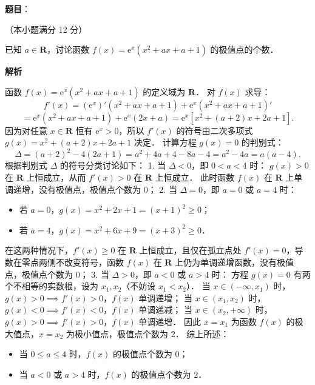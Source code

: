 \begin{answer}

\textbf{题目}：

（本小题满分 12 分）

已知 $a \in \mathbf{R}$，讨论函数 $f(x) = \mathrm{e}^x(x^2 + ax + a + 1)$ 的极值点的个数．

\textbf{解析}

函数 $f(x) = \mathrm{e}^x(x^2 + ax + a + 1)$ 的定义域为 $\mathbf{R}$．
对 $f(x)$ 求导：
\nopagebreak[4]
\[
f'(x) = (\mathrm{e}^x)'(x^2 + ax + a + 1) + \mathrm{e}^x(x^2 + ax + a + 1)'
\]
\nopagebreak[4]
\[
= \mathrm{e}^x (x^2 + ax + a + 1) + \mathrm{e}^x (2x + a) = \mathrm{e}^x [x^2 + (a + 2)x + 2a + 1].
\]
因为对任意 $x \in \mathbf{R}$ 恒有 $\mathrm{e}^x > 0$，所以 $f'(x)$ 的符号由二次多项式 $g(x) = x^2 + (a + 2)x + 2a + 1$ 决定．
计算方程 $g(x) = 0$ 的判别式：
\nopagebreak[4]
\[
\Delta = (a + 2)^2 - 4(2a + 1) = a^2 + 4a + 4 - 8a - 4 = a^2 - 4a = a(a - 4).
\]
根据判别式 $\Delta$ 的符号分类讨论如下：
1. 当 $\Delta < 0$，即 $0 < a < 4$ 时：
$g(x) > 0$ 在 $\mathbf{R}$ 上恒成立，从而 $f'(x) > 0$ 在 $\mathbf{R}$ 上恒成立．
此时函数 $f(x)$ 在 $\mathbf{R}$ 上单调递增，没有极值点，极值点个数为 0；
2. 当 $\Delta = 0$，即 $a = 0$ 或 $a = 4$ 时：
\begin{itemize}
\item 若 $a = 0$，$g(x) = x^2 + 2x + 1 = (x + 1)^2 \geqslant 0$；
\item 若 $a = 4$，$g(x) = x^2 + 6x + 9 = (x + 3)^2 \geqslant 0$．
\end{itemize}
在这两种情况下，$f'(x) \geqslant 0$ 在 $\mathbf{R}$ 上恒成立，且仅在孤立点处 $f'(x) = 0$，导数在零点两侧不改变符号，函数 $f(x)$ 在 $\mathbf{R}$ 上仍为单调递增函数，没有极值点，极值点个数为 0；
3. 当 $\Delta > 0$，即 $a < 0$ 或 $a > 4$ 时：
方程 $g(x) = 0$ 有两个不相等的实数根，设为 $x_1, x_2$（不妨设 $x_1 < x_2$）．
当 $x \in (-\infty, x_1)$ 时，$g(x) > 0 \implies f'(x) > 0$，$f(x)$ 单调递增；
当 $x \in (x_1, x_2)$ 时，$g(x) < 0 \implies f'(x) < 0$，$f(x)$ 单调递减；
当 $x \in (x_2, +\infty)$ 时，$g(x) > 0 \implies f'(x) > 0$，$f(x)$ 单调递增．
因此 $x = x_1$ 为函数 $f(x)$ 的极大值点，$x = x_2$ 为极小值点，极值点个数为 2．
综上所述：
\begin{itemize}
\item 当 $0 \leqslant a \leqslant 4$ 时，$f(x)$ 的极值点个数为 0；
\item 当 $a < 0$ 或 $a > 4$ 时，$f(x)$ 的极值点个数为 2．
\end{itemize}


\end{answer}
